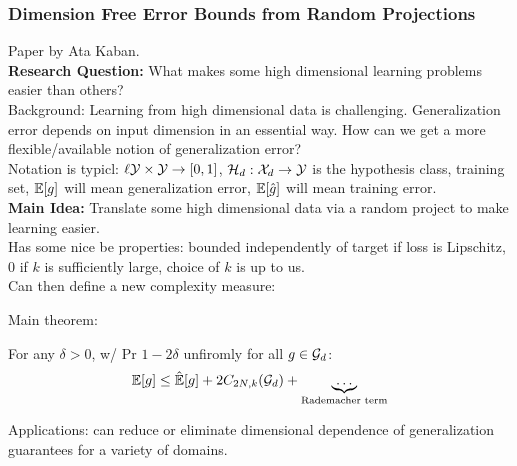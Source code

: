 \subsubsection{Dimension Free Error Bounds from Random Projections~\cite{kaban2019dimension}}

Paper by Ata Kaban. \\

{\bf Research Question:} What makes some high dimensional learning problems easier than others? \\

Background: Learning from high dimensional data is challenging. Generalization error depends on input dimension in an essential way. How can we get a more flexible/available notion of generalization error? \\

Notation is typicl: $\ell \mathcal{Y} \times \mathcal{Y} \rightarrow [0,1]$, $\mathcal{H}_d : \mathcal{X}_d \rightarrow \mathcal{Y}$ is the hypothesis class, training set, $\mathbb{E}[g]$ will mean generalization error, $\mathbb{E}[\hat{g}]$ will mean training error. \\

{\bf Main Idea:} Translate some high dimensional data via a random project to make learning easier. \\

Has some nice be properties: bounded independently of target if loss is Lipschitz, 0 if $k$ is sufficiently large, choice of $k$ is up to us. \\

Can then define a new complexity measure:

Main theorem:
\begin{theorem}
For any $\delta > 0$, w/ Pr $1-2\delta$ unfiromly for all $g \in \mathcal{G}_d$:
\begin{equation}
    \mathbb{E}[g] \leq\hat{\mathbb{E}}[g] + 2C_{2N,k}(\mathcal{G}_d) + \underbrace{\ldots}_{\text{Rademacher term}}
\end{equation}
\end{theorem}
Applications: can reduce or eliminate dimensional dependence of generalization guarantees for a variety of domains. \\

